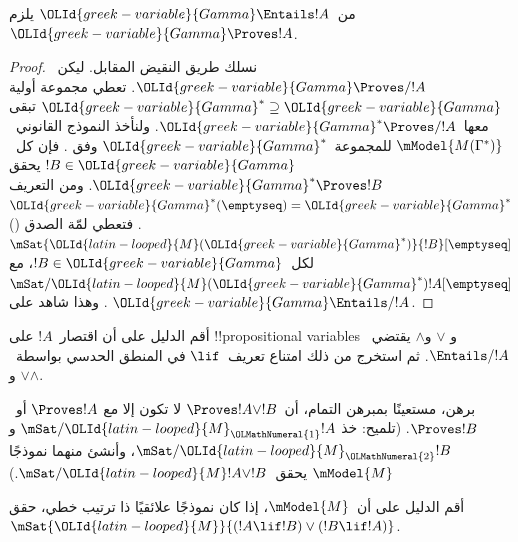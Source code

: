\documentclass[../../../include/open-logic-section]{subfiles}
\begin{document}


\begin{thm}
  من~$\OLId{greek-variable}{Gamma} \Entails !A$ يلزم~$\OLId{greek-variable}{Gamma} \Proves !A$.
\end{thm}

\begin{proof}
  نسلك طريق النقيض المقابل. ليكن~$\OLId{greek-variable}{Gamma} \Proves/ !A$. تعطي
   مجموعة أولية
  $\OLId{greek-variable}{Gamma}^* \supseteq \OLId{greek-variable}{Gamma}$ تبقى معها~$\OLId{greek-variable}{Gamma}^* \Proves/ !A$. ولنأخذ
  النموذج القانوني~$\mModel{M(\Gamma^*)}$ للمجموعة~$\OLId{greek-variable}{Gamma}^*$ وفق
  . فإن كل~$!B \in \OLId{greek-variable}{Gamma}$ يحقق
  $\OLId{greek-variable}{Gamma}^* \Proves !B$. ومن التعريف
  $\OLId{greek-variable}{Gamma}^*(\emptyseq)=\OLId{greek-variable}{Gamma}^*$. فتعطي لمّة الصدق
  ()
  $\mSat{\OLId{latin-looped}{M}(\OLId{greek-variable}{Gamma}^*)}{!B}[\emptyseq]$ لكل~$!B \in \OLId{greek-variable}{Gamma}$، مع
  $\mSat/{\OLId{latin-looped}{M}(\OLId{greek-variable}{Gamma}^*)}{!A}[\emptyseq]$. وهذا شاهد على
  $\OLId{greek-variable}{Gamma} \Entails/ !A$.
\end{proof}

\begin{prob}
  أقم الدليل على أن اقتصار~$!A$ على !!{propositional variable}s و
  $\lor$ و$\land$ يقتضي~$\Entails/ !A$. ثم استخرج من ذلك امتناع تعريف~$\lif$
  في المنطق الحدسي بواسطة~$\lor$ و$\land$.
\end{prob}

\begin{prob}
  برهن، مستعينًا بمبرهن التمام، أن~$\Proves !A \lor !B$ لا تكون إلا مع
  $\Proves !A$ أو~$\Proves !B$. (تلميح: خذ
  $\mSat/{\OLId{latin-looped}{M}_\OLMathNumeral{1}}{!A}$ و$\mSat/{\OLId{latin-looped}{M}_\OLMathNumeral{2}}{!B}$، وأنشئ منهما نموذجًا
  $\mModel{M}$ يحقق~$\mSat/{\OLId{latin-looped}{M}}{!A \lor !B}$.)
\end{prob}

\begin{prob}
  أقم الدليل على أن~$\mModel{M}$، إذا كان نموذجًا علائقيًا ذا ترتيب خطي،
  حقق~$\mSat{\OLId{latin-looped}{M}}{(!A \lif !B)\lor(!B \lif !A)}$.
\end{prob}
\end{document}
